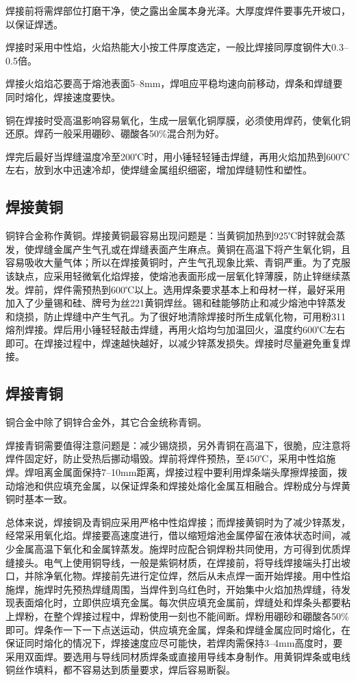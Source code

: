 \documentclass{ctexbook}
\begin{document}
焊接前将需焊部位打磨干净，使之露出金属本身光泽。大厚度焊件要事先开坡口，以保证焊透。

焊接时采用中性焰，火焰热能大小按工件厚度选定，一般比焊接同厚度钢件大0.3--0.5倍。

焊接火焰焰芯要高于熔池表面5--8mm，焊咀应平稳均速向前移动，焊条和焊缝要同时熔化，焊接速度要快。

铜在焊接时受高温影响容易氧化，生成一层氧化铜厚膜，必须使用焊药，使氧化铜还原。焊药一般采用硼砂、硼酸各50\%混合剂为好。

焊完后最好当焊缝温度冷至200℃时，用小锤轻轻锤击焊缝，再用火焰加热到600℃左右，放到水中迅速冷却，使焊缝金属组织细密，增加焊缝韧性和塑性。
\subsection{焊接黄铜}
铜锌合金称作黄铜。焊接黄铜最容易出现问题是：当黄铜加热到925℃时锌就会蒸发，使焊缝金属产生气孔或在焊缝表面产生麻点。黄铜在高温下将产生氧化铜，且容易吸收大量气体；所以在焊接黄铜时，产生气孔现象比紫、青铜严重。为了克服该缺点，应采用轻微氧化焰焊接，使熔池表面形成一层氧化锌薄膜，防止锌继续蒸发。焊前，焊件需预热到600℃以上。选用焊条要求基本上和母材一样，最好采用加入了少量锡和硅、牌号为丝221黄铜焊丝。锡和硅能够防止和减少熔池中锌蒸发和烧损，防止焊缝中产生气孔。为了很好地清除焊接时所生成氧化物，可用粉311熔剂焊接。焊后用小锤轻轻敲击焊缝，再用火焰均匀加温回火，温度约600℃左右即可。在焊接过程中，焊速越快越好，以减少锌蒸发损失。焊接时尽量避免重复焊接。
\subsection{焊接青铜}
铜合金中除了铜锌合金外，其它合金统称青铜。

焊接青铜需要值得注意问题是：减少锡烧损，另外青铜在高温下，很脆，应注意将焊件固定好，防止受热后挪动塌毁。焊前将焊件预热，至450℃，采用中性焰施焊。焊咀离金属面保持7--10mm距离，焊接过程中要利用焊条端头摩擦焊接面，拨动熔池和供应填充金属，以保证焊条和焊接处熔化金属互相融合。焊粉成分与焊黄铜时基本一致。

总体来说，焊接铜及青铜应采用严格中性焰焊接；而焊接黄铜时为了减少锌蒸发，经常采用氧化焰。焊接要高速度进行，借以缩短熔池金属停留在液体状态时间，减少金属高温下氧化和金属锌蒸发。施焊时应配合铜焊粉共同使用，方可得到优质焊缝接头。电气上使用铜导线，一般是紫铜材质，在焊接前，将导线焊接端头打出坡口，并除净氧化物。焊接前先进行定位焊，然后从未点焊一面开始焊接。用中性焰施焊，施焊时先预热焊缝周围，当焊件到乌红色时，开始集中火焰加热焊缝，待发现表面熔化时，立即供应填充金属。每次供应填充金属前，焊缝处和焊条头都要粘上焊粉，在整个焊接过程中，焊粉使用一刻也不能间断。焊粉用硼砂和硼酸各50\%即可。焊条作一下一下点送运动，供应填充金属，焊条和焊缝金属应同时熔化，在保证同时熔化的情况下，焊接速度应尽可能快，若焊肉需保持3--4mm高度时，要采用双面焊。要选用与导线同材质焊条或直接用导线本身制作。用黄铜焊条或电线铜丝作填料，都不容易达到质量要求，焊后容易断裂。
\end{document}
